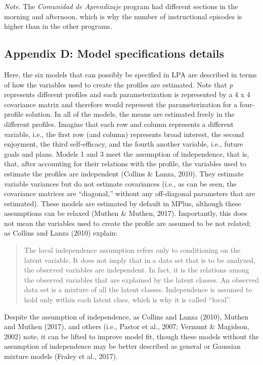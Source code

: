 \documentclass[]{msu-thesis}
\theoremstyle{definition}
\theoremstyle{definition}
\theoremstyle{definition}
\theoremstyle{remark}
\begin{document}
\emph{Note}. The \emph{Comunidad de Aprendizaje} program had different
sections in the morning and afternoon, which is why the number of
instructional episodes is higher than in the other programs.

\subsection{Appendix D: Model specifications
details}\label{appendix-d-model-specifications-details}

Here, the six models that can possibly be specified in LPA are described
in terms of how the variables used to create the profiles are estimated.
Note that \emph{p} represents different profiles and each
parameterization is represented by a 4 x 4 covariance matrix and
therefore would represent the parameterization for a four-profile
solution. In all of the models, the means are estimated freely in the
different profiles. Imagine that each row and column represents a
different variable, i.e., the first row (and column) represents broad
interest, the second enjoyment, the third self-efficacy, and the fourth
another variable, i.e., future goals and plans. Models 1 and 3 meet the
assumption of independence, that is, that, after accounting for their
relations with the profile, the variables used to estimate the profiles
are independent (Collins \& Lanza, 2010). They estimate variable
variances but do not estimate covariances (i.e., as can be seen, the
covariance matrices are ``diagonal,'' without any off-diagonal
parameters that are estimated). These models are estimated by default in
MPlus, although these assumptions can be relaxed (Muthen \& Muthen,
2017). Importantly, this does not mean the variables used to create the
profile are assumed to be not related; as Collins and Lanza (2010)
explain:

\begin{quote}
The local independence assumption refers only to conditioning on the
latent variable. It does not imply that in a data set that is to be
analyzed, the observed variables are independent. In fact, it is the
relations among the observed variables that are explained by the latent
classes. An observed data set is a mixture of all the latent classes.
Independence is assumed to hold only within each latent class, which is
why it is called ``local''.
\end{quote}

Despite the assumption of independence, as Collins and Lanza (2010),
Muthen and Muthen (2017), and others (i.e., Pastor et al., 2007; Vermunt
\& Magidson, 2002) note, it can be lifted to improve model fit, though
these models without the assumption of independence may be better
described as general or Gaussian mixture models (Fraley et al., 2017).
\end{document}
